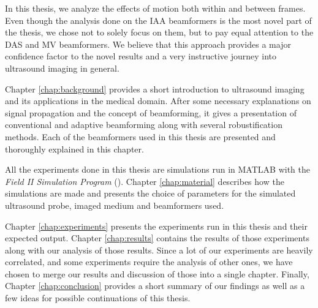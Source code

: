 In this thesis, we analyze the effects of motion both within and between frames.
Even though the analysis done on the IAA beamformers is the most novel part of the thesis, we chose not to solely focus on them, but to pay equal attention to the DAS and MV beamformers. We believe that this approach provides a major confidence factor to the novel results and a very instructive journey into ultrasound imaging in general.

Chapter \ref{chap:background} provides a short introduction to ultrasound imaging and its applications in the medical domain.
After some necessary explanations on signal propagation and the concept of beamforming, it gives a presentation of conventional and adaptive beamforming along with several robustification methods.
Each of the beamformers used in this thesis are presented and thoroughly explained in this chapter.

All the experiments done in this thesis are simulations run in MATLAB with the \textit{Field II Simulation Program} (\cite{Field_II,Field_II_ext}).
Chapter \ref{chap:material} describes how the simulations are made and presents the choice of parameters for the simulated ultrasound probe, imaged medium and beamformers used.

Chapter \ref{chap:experiments} presents the experiments run in this thesis and their expected output.
Chapter \ref{chap:results} contains the results of those experiments along with our analysis of those results.
Since a lot of our experiments are heavily correlated, and some experiments require the analysis of other ones, we have chosen to merge our results and discussion of those into a single chapter.
Finally, Chapter \ref{chap:conclusion} provides a short summary of our findings as well as a few ideas for possible continuations of this thesis.

